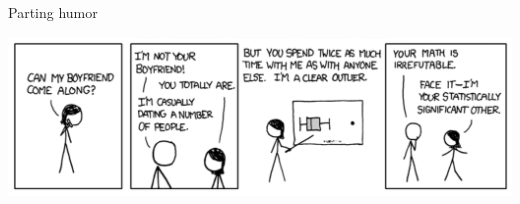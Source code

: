 \documentclass[
  ignorenonframetext,
  aspectratio=169]{beamer}
\begin{document}
\begin{frame}{Parting humor}
\protect\hypertarget{parting-humor}{}
\begin{center}\includegraphics[width=0.7\linewidth]{./images/boyfriend} \end{center}
\end{frame}
\end{document}
